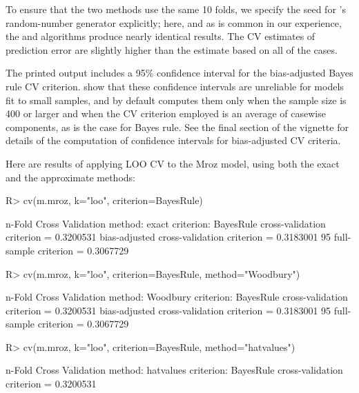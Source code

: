 \documentclass[
]{jss}
\begin{document}
To ensure that the two methods use the same 10 folds, we specify the
seed for 's random-number generator explicitly; here, and as
is common in our experience, the  and 
algorithms produce nearly identical results. The CV estimates of
prediction error are slightly higher than the estimate based on all of
the cases.

The printed output includes a 95\% confidence interval for the
bias-adjusted Bayes rule CV criterion.
\citet{BatesHastieTibshirani:2023} show that these confidence intervals
are unreliable for models fit to small samples, and by default
 computes them only when the sample size is 400 or larger and
when the CV criterion employed is an average of casewise components, as
is the case for Bayes rule. See the final section of the vignette for
details of the computation of confidence intervals for bias-adjusted CV
criteria.

Here are results of applying LOO CV to the Mroz model, using both the
exact and the approximate methods:

\begin{CodeChunk}
\begin{CodeInput}
R> cv(m.mroz, k="loo", criterion=BayesRule)
\end{CodeInput}
\begin{CodeOutput}
n-Fold Cross Validation
method: exact
criterion: BayesRule
cross-validation criterion = 0.3200531
bias-adjusted cross-validation criterion = 0.3183001
95%
full-sample criterion = 0.3067729 
\end{CodeOutput}
\begin{CodeInput}
R> cv(m.mroz, k="loo", criterion=BayesRule, method="Woodbury")
\end{CodeInput}
\begin{CodeOutput}
n-Fold Cross Validation
method: Woodbury
criterion: BayesRule
cross-validation criterion = 0.3200531
bias-adjusted cross-validation criterion = 0.3183001
95%
full-sample criterion = 0.3067729 
\end{CodeOutput}
\begin{CodeInput}
R> cv(m.mroz, k="loo", criterion=BayesRule, method="hatvalues")
\end{CodeInput}
\begin{CodeOutput}
n-Fold Cross Validation
method: hatvalues
criterion: BayesRule
cross-validation criterion = 0.3200531
\end{CodeOutput}
\end{CodeChunk}
\end{document}
